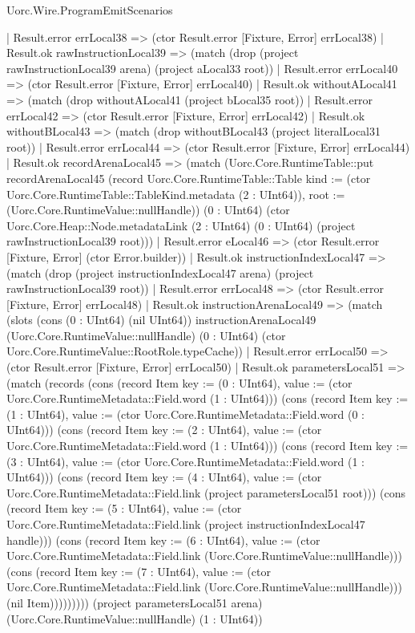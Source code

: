 \begin{lexlean}{Uorc.Wire.ProgramEmitScenarios}
\begin{semanticmodule}
{        | Result.error errLocal38 => (ctor Result.error [Fixture, Error] errLocal38)
        | Result.ok rawInstructionLocal39 => (match (drop (project rawInstructionLocal39 arena) (project aLocal33 root))
          | Result.error errLocal40 => (ctor Result.error [Fixture, Error] errLocal40)
          | Result.ok withoutALocal41 => (match (drop withoutALocal41 (project bLocal35 root))
            | Result.error errLocal42 => (ctor Result.error [Fixture, Error] errLocal42)
            | Result.ok withoutBLocal43 => (match (drop withoutBLocal43 (project literalLocal31 root))
              | Result.error errLocal44 => (ctor Result.error [Fixture, Error] errLocal44)
              | Result.ok recordArenaLocal45 => (match (Uorc.Core.RuntimeTable::put recordArenaLocal45 (record Uorc.Core.RuntimeTable::Table {kind := (ctor Uorc.Core.RuntimeTable::TableKind.metadata (2 : UInt64)), root := (Uorc.Core.RuntimeValue::nullHandle)}) (0 : UInt64) (ctor Uorc.Core.Heap::Node.metadataLink (2 : UInt64) (0 : UInt64) (project rawInstructionLocal39 root)))
                | Result.error eLocal46 => (ctor Result.error [Fixture, Error] (ctor Error.builder))
                | Result.ok instructionIndexLocal47 => (match (drop (project instructionIndexLocal47 arena) (project rawInstructionLocal39 root))
                  | Result.error errLocal48 => (ctor Result.error [Fixture, Error] errLocal48)
                  | Result.ok instructionArenaLocal49 => (match (slots (cons (0 : UInt64) (nil UInt64)) instructionArenaLocal49 (Uorc.Core.RuntimeValue::nullHandle) (0 : UInt64) (ctor Uorc.Core.RuntimeValue::RootRole.typeCache))
                    | Result.error errLocal50 => (ctor Result.error [Fixture, Error] errLocal50)
                    | Result.ok parametersLocal51 => (match (records (cons (record Item {key := (0 : UInt64), value := (ctor Uorc.Core.RuntimeMetadata::Field.word (1 : UInt64))}) (cons (record Item {key := (1 : UInt64), value := (ctor Uorc.Core.RuntimeMetadata::Field.word (0 : UInt64))}) (cons (record Item {key := (2 : UInt64), value := (ctor Uorc.Core.RuntimeMetadata::Field.word (1 : UInt64))}) (cons (record Item {key := (3 : UInt64), value := (ctor Uorc.Core.RuntimeMetadata::Field.word (1 : UInt64))}) (cons (record Item {key := (4 : UInt64), value := (ctor Uorc.Core.RuntimeMetadata::Field.link (project parametersLocal51 root))}) (cons (record Item {key := (5 : UInt64), value := (ctor Uorc.Core.RuntimeMetadata::Field.link (project instructionIndexLocal47 handle))}) (cons (record Item {key := (6 : UInt64), value := (ctor Uorc.Core.RuntimeMetadata::Field.link (Uorc.Core.RuntimeValue::nullHandle))}) (cons (record Item {key := (7 : UInt64), value := (ctor Uorc.Core.RuntimeMetadata::Field.link (Uorc.Core.RuntimeValue::nullHandle))}) (nil Item))))))))) (project parametersLocal51 arena) (Uorc.Core.RuntimeValue::nullHandle) (1 : UInt64))
}
\end{semanticmodule}
\end{lexlean}
